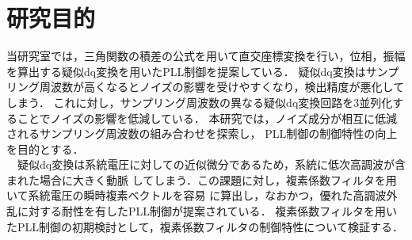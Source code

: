 \section{研究目的}
当研究室では，三角関数の積差の公式を用いて直交座標変換を行い，位相，振幅を算出する疑似dq変換を用いたPLL制御を提案している．
疑似dq変換はサンプリング周波数が高くなるとノイズの影響を受けやすくなり，検出精度が悪化してしまう．
これに対し，サンプリング周波数の異なる疑似dq変換回路を3並列化することでノイズの影響を低減している．
本研究では，ノイズ成分が相互に低減されるサンプリング周波数の組み合わせを探索し，
PLL制御の制御特性の向上を目的とする．\\
　疑似dq変換は系統電圧に対しての近似微分であるため，系統に低次高調波が含まれた場合に大きく動脈
してしまう．この課題に対し，複素係数フィルタを用いて系統電圧の瞬時複素ベクトルを容易
に算出し，なおかつ，優れた高調波外乱に対する耐性を有したPLL制御が提案されている\cite{ref03}．
複素係数フィルタを用いたPLL制御の初期検討として，複素係数フィルタの制御特性について検証する．
